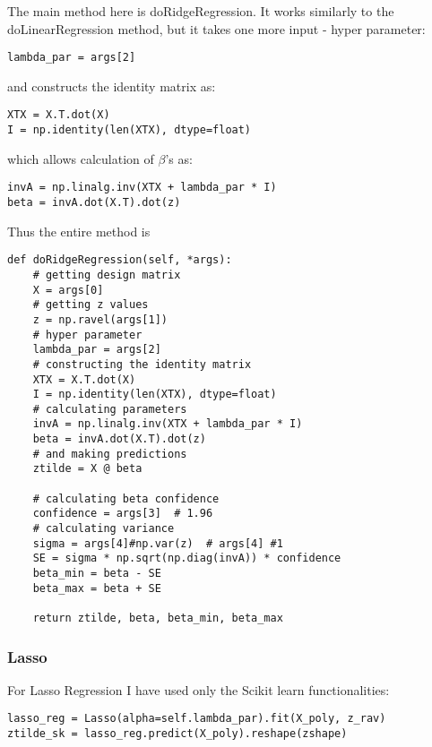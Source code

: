 The main method here is doRidgeRegression. It works similarly to the doLinearRegression method, but it takes one more input - hyper parameter:
\begin{lstlisting}
lambda_par = args[2]
\end{lstlisting}
and constructs the identity matrix as:
\begin{lstlisting}
XTX = X.T.dot(X)
I = np.identity(len(XTX), dtype=float)
\end{lstlisting}
which allows calculation of $\beta$'s as:
\begin{lstlisting}
invA = np.linalg.inv(XTX + lambda_par * I)
beta = invA.dot(X.T).dot(z)
\end{lstlisting}
Thus the entire method is
\begin{lstlisting}
def doRidgeRegression(self, *args):
    # getting design matrix
    X = args[0]
    # getting z values
    z = np.ravel(args[1])
    # hyper parameter
    lambda_par = args[2]
    # constructing the identity matrix
    XTX = X.T.dot(X)
    I = np.identity(len(XTX), dtype=float)
    # calculating parameters
    invA = np.linalg.inv(XTX + lambda_par * I)
    beta = invA.dot(X.T).dot(z)
    # and making predictions
    ztilde = X @ beta

    # calculating beta confidence
    confidence = args[3]  # 1.96
    # calculating variance
    sigma = args[4]#np.var(z)  # args[4] #1
    SE = sigma * np.sqrt(np.diag(invA)) * confidence
    beta_min = beta - SE
    beta_max = beta + SE

    return ztilde, beta, beta_min, beta_max
\end{lstlisting}

\subsubsection{Lasso}

For Lasso Regression I have used only the Scikit learn functionalities:
\begin{lstlisting}
lasso_reg = Lasso(alpha=self.lambda_par).fit(X_poly, z_rav)
ztilde_sk = lasso_reg.predict(X_poly).reshape(zshape)
\end{lstlisting}

